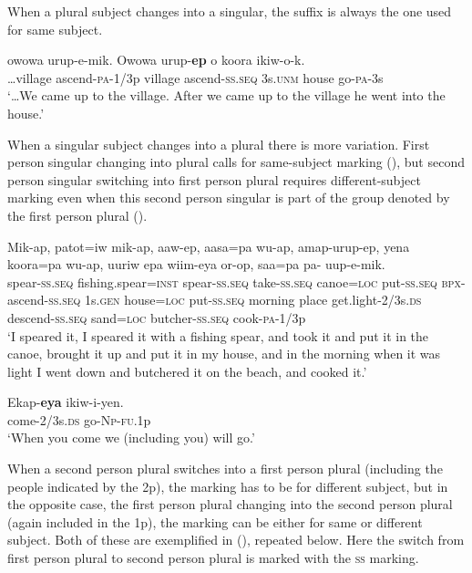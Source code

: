 When a plural subject changes into a singular, the suffix is always the one used for same subject. 

\ea%
\label{ex:x1438}
\gll {\dots}owowa  urup-e-mik.  Owowa  urup-\textbf{ep } o  koora ikiw-o-k.\\
{\dots}village  ascend-\textsc{pa}-1/3p  village  ascend-\textsc{ss}.\textsc{seq} 3s.\textsc{unm} house go-\textsc{pa}-3s\\
\glt`{\dots}We came up to the village. After we came up to the village he went into the house.'
\z


When a singular subject changes into a plural there is more variation. First person singular changing into plural calls for same-subject marking (), but second person singular switching into first person plural requires different-subject marking even when this second person singular is part of the group denoted by the first person plural (). 

\ea%
\label{ex:x1435}
\gll Mik-ap,  patot=iw  mik-ap,  aaw-ep, aasa=pa  wu-ap,  amap-urup-ep,  yena  koora=pa wu-ap,  uuriw  epa  wiim-eya  or-op, saa=pa  pa-  uup-e-mik.\\
spear-\textsc{ss}.\textsc{seq} fishing.spear=\textsc{inst} spear-\textsc{ss}.\textsc{seq} take-\textsc{ss}.\textsc{seq} canoe=\textsc{loc} put-\textsc{ss}.\textsc{seq} \textsc{\textsc{bp}x}-ascend-\textsc{ss}.\textsc{seq} 1s.\textsc{gen} house=\textsc{loc} put-\textsc{ss}.\textsc{seq} morning place get.light-2/3s.\textsc{ds} descend-\textsc{ss}.\textsc{seq} sand=\textsc{loc} butcher-\textsc{ss}.\textsc{seq} cook-\textsc{pa}-1/3p\\
\glt`I speared it, I speared it with a fishing spear, and took it and put it in the canoe, brought it up and put it in my house, and in the morning when it was light I went down and butchered it on the beach, and  cooked it.'
\z


\ea%
\label{ex:x1439}
\gll Ekap-\textbf{eya} ikiw-i-yen.\\
come-2/3s.\textsc{ds} go-\textsc{Np}-\textsc{fu}.1p\\
\glt`When you come we (including you) will go.'
\z


When a second person plural switches into a first person plural (including the people indicated by the 2p), the marking has to be for different subject, but in the opposite case, the first person plural changing into the second person plural (again included in the 1p), the marking can be either for same or different subject. Both of these are exemplified in (), repeated below. Here the switch from first person plural to second person plural is marked with the \textsc{ss} marking.

